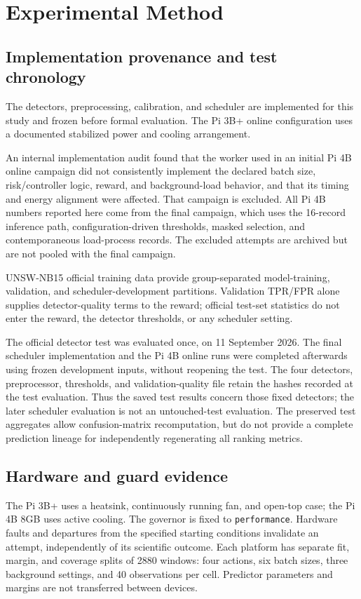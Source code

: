 \documentclass[journal]{IEEEtran}
\begin{document}
\section{Experimental Method}
\subsection{Implementation provenance and test chronology}
The detectors, preprocessing, calibration, and scheduler are implemented for this study and frozen before formal evaluation. The Pi 3B+ online configuration uses a documented stabilized power and cooling arrangement.

An internal implementation audit found that the worker used in an initial Pi 4B online campaign did not consistently implement the declared batch size, risk/controller logic, reward, and background-load behavior, and that its timing and energy alignment were affected. That campaign is excluded. All Pi 4B numbers reported here come from the final campaign, which uses the 16-record inference path, configuration-driven thresholds, masked selection, and contemporaneous load-process records. The excluded attempts are archived but are not pooled with the final campaign.

UNSW-NB15 official training data \cite{moustafa2015unsw} provide group-separated model-training, validation, and scheduler-development partitions. Validation TPR/FPR alone supplies detector-quality terms to the reward; official test-set statistics do not enter the reward, the detector thresholds, or any scheduler setting.

The official detector test was evaluated once, on 11 September 2026. The final scheduler implementation and the Pi 4B online runs were completed afterwards using frozen development inputs, without reopening the test. The four detectors, preprocessor, thresholds, and validation-quality file retain the hashes recorded at the test evaluation. Thus the saved test results concern those fixed detectors; the later scheduler evaluation is not an untouched-test evaluation. The preserved test aggregates allow confusion-matrix recomputation, but do not provide a complete prediction lineage for independently regenerating all ranking metrics.

\subsection{Hardware and guard evidence}
The Pi 3B+ uses a heatsink, continuously running fan, and open-top case; the Pi 4B 8GB uses active cooling. The governor is fixed to \texttt{performance}. Hardware faults and departures from the specified starting conditions invalidate an attempt, independently of its scientific outcome. Each platform has separate fit, margin, and coverage splits of 2880 windows: four actions, six batch sizes, three background settings, and 40 observations per cell. Predictor parameters and margins are not transferred between devices.
\end{document}
